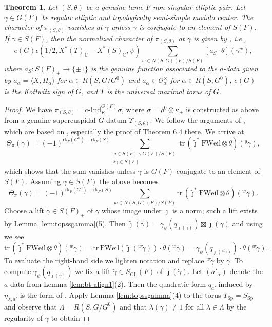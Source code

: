 \documentclass{article}
\def\tx#1{\textrm{#1}}
\def\C{\mathbb{C}}
\def\lmod{\backslash}
\def\<{\langle}
\def\>{\rangle}
\def\cO{\mathcal{O}}
\DeclareMathOperator{\Sp}{Sp}
\DeclareMathOperator{\GL}{GL}
\newtheorem{thm}{Theorem}[subsection]
\theoremstyle{definition}
\numberwithin{equation}{subsection}
\renewcommand{\-}{\hyp{}}
\begin{document}
\begin{thm}\label{thm:characterformula}
	Let $(S,\theta)$ be a genuine tame $F$-non-singular elliptic pair.
	Let $\gamma \in G(F)$ be regular elliptic and topologically semi-simple modulo center. The character of $\pi_{(S,\theta)}$ vanishes at $\gamma$ unless $\gamma$ is conjugate to an element of $S(F)$. If $\gamma \in S(F)$, then the normalized character of $\pi_{(S,\theta)}$ at $\gamma$ is given by \cite[(4.3.2)]{KalDC}, i.e.,
	\[ e(G)\epsilon(1/2,X^*(T)_\C-X^*(S)_\C,\psi)\sum_{w \in N(S,G)(F)/S(F)}[a_S\cdot\theta](\gamma^w), \]
	where $a_S : S(F)_\pm \to \{\pm1\}$ is the genuine function associated to the $a$-data given by $a_\alpha=\<X,H_\alpha\>$ for $\alpha \in R(S,G/G^0)$ and $a_\alpha \in \cO_\alpha^\times$ for $\alpha \in R(S,G^0)$, $e(G)$ is the Kottwitz sign of $G$, and $T$ is the universal maximal torus of $G$.
\end{thm} \begin{proof}
	We have $\pi_{(S,\theta)}=\tx{c-Ind}_K^{G(F)}\sigma$, where $\sigma=\rho^0 \otimes \kappa_{\pm}$ is constructed as above from a genuine supercuspidal $G$-datum $\Upsilon_{(S,\theta)}$. We follow the arguments of \cite[\S4.4,\S4.10]{KalRSP}, which are based on \cite{AS09}, especially the proof of Theorem 6.4 there. We arrive at 
\[ \Theta_\pi(\gamma) = (-1)^{\tx{rk}_F(G^0)-\tx{rk}_F(S)}\sum_{\substack{g \in S(F) \lmod G(F)/S(F)\\ {^g\gamma} \in S(F)}} \tx{tr}\,(\tilde\jmath^*\mathrm{FWeil} \otimes\theta)({^g\gamma}), \]
	which shows that the sum vanishes unless $\gamma$ is $G(F)$-conjugate to an element of $S(F)$. Assuming $\gamma \in S(F)$ the above becomes
	\[ \Theta_\pi(\gamma) = (-1)^{\tx{rk}_F(G^0)-\tx{rk}_F(S)}\sum_{w \in N(S,G)(F)/S(F)} \tx{tr}\,(\tilde\jmath^*\mathrm{FWeil} \otimes\theta)({^w\gamma}). \]
	Choose a lift $\dot\gamma\in S(F)_\pm$ of $\gamma$ whose image under $\jmath$ is a norm; such a lift exists by Lemma \ref{lem:topssgamma}(5). Then $\tilde \jmath(\dot \gamma) = \gamma_\psi(q_{\jmath(\dot \gamma)}) \boxtimes \bar\jmath(\gamma)$ and using \cite[Theorem B]{Thomas2013} we see
	\[ \tx{tr}\,(\tilde\jmath^*\mathrm{FWeil} \otimes\theta)({^w\gamma}) = \tx{tr}\,\mathrm{FWeil}(\tilde\jmath({^w}\dot\gamma)) \cdot \theta({^w\dot\gamma}) = \gamma_\psi(q_{\jmath(^w\dot\gamma)})\cdot\theta({^w}\dot\gamma). \]
	To evaluate the right-hand side we lighten notation and replace ${}^w\dot\gamma$ by $\dot\gamma$. To compute $\gamma_\psi(q_{\jmath(\dot\gamma)})$ we fix a lift $\tilde\gamma \in S_{\GL}(F)$ of $\jmath(\dot\gamma)$. Let $(a'_\alpha)$ denote the $a$-data from Lemma \ref{lem:bt-align1}(2). Then the quadratic form $q_{a'}$ induced by $\eta_{\lambda,a'}$ is the form of \cite[Definition 5.4.5]{FKS23}. Apply Lemma \ref{lem:topssgamma}(4) to the torus $T_{\Sp}=S_{\Sp}$ and observe that $\Lambda=R(S,G/G^0)$ and that $\lambda(\gamma) \neq 1$ for all $\lambda \in \Lambda$ by the regularity of $\gamma$ to obtain

\end{proof}
\end{document}
